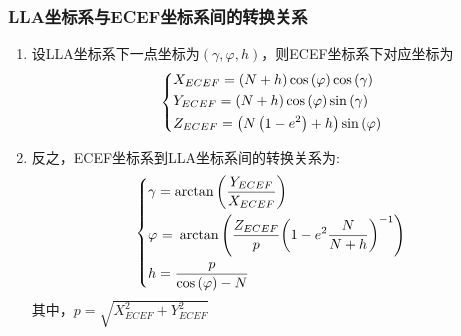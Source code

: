 \subsubsection{LLA坐标系与ECEF坐标系间的转换关系}
\begin{enumerate}
  \item 设LLA坐标系下一点坐标为$(\gamma, \varphi, h)$，则ECEF坐标系下对应坐标为
  \begin{equation}
    \left\{ \begin{gathered}
      {X_{ECEF}} = \left( {N + h} \right)\cos \left( \varphi  \right)\cos \left( \gamma  \right) \hfill \\
      {Y_{ECEF}} = \left( {N + h} \right)\cos \left( \varphi  \right)\sin \left( \gamma  \right) \hfill \\
      {Z_{ECEF}} = \left( {N\left( {1 - {e^2}} \right) + h} \right)\sin \left( \varphi  \right) \hfill \\ 
    \end{gathered}  \right.
  \end{equation}
  \item 反之，ECEF坐标系到LLA坐标系间的转换关系为:
  \begin{equation}
    \left\{ \begin{gathered}
      \gamma  = \arctan \left( {\frac{{{Y_{ECEF}}}}{{{X_{ECEF}}}}} \right) \hfill \\
      \varphi {\text{ = }}\arctan \left( {\frac{Z_{ECEF}}{p}{{\left( {1 - {e^2}\frac{N}{{N + h}}} \right)}^{ - 1}}} \right) \hfill \\
      h = \frac{p}{{\cos \left( \varphi  \right) - N}} \hfill \\ 
    \end{gathered}  \right.
  \end{equation}
  其中，$p = \sqrt{X_{ECEF}^2 + Y_{ECEF}^2}$
\end{enumerate}
